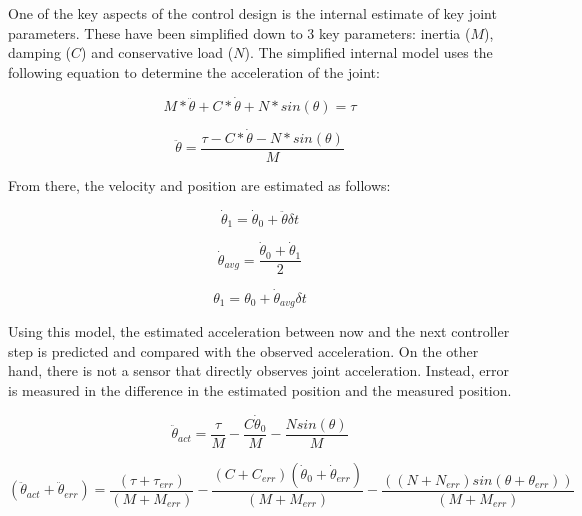 
One of the key aspects of the control design is the internal estimate of key 
joint parameters. These have been simplified down to 3 key parameters: inertia 
($M$), damping ($C$) and conservative load ($N$). The simplified internal 
model uses the following equation to determine the acceleration of the joint:

\begin{equation}
M * \ddot{\theta} + C * \dot{\theta} + N * sin(\theta) = \tau
\end{equation}

\begin{equation}
\ddot{\theta} = \dfrac{\tau - C * \dot{\theta} - N * sin(\theta)}{M}
\end{equation}

From there, the velocity and position are estimated as follows:

\begin{equation}
\dot{\theta}_{1} = \dot{\theta}_{0} + \ddot{\theta} \delta t
\end{equation}

\begin{equation}
\dot{\theta}_{avg} = \dfrac{\dot{\theta}_{0} + \dot{\theta}_{1}}{2}
\end{equation}

\begin{equation}
\theta_{1} = \theta_{0} + \dot{\theta}_{avg} \delta t
\end{equation}

Using this model, the estimated acceleration between now and the next controller 
step is predicted and compared with the observed acceleration. On the other hand,
there is not a sensor that directly observes joint acceleration. Instead, error
is measured in the difference in the estimated position and the measured 
position.


\begin{equation}
\ddot{\theta}_{act} = \dfrac{\tau}{M} - \dfrac{C \dot{\theta}_{0}}{M} - \dfrac{N sin(\theta)}{M}
\end{equation}

\begin{equation}
(\ddot{\theta}_{act} + \ddot{\theta}_{err}) = \dfrac{(\tau + \tau_{err})}{(M + M_{err})} - \dfrac{(C + C_{err}) (\dot{\theta}_{0} + \dot{\theta}_{err})}{(M + M_{err})} - \dfrac{((N + N_{err})sin(\theta + \theta_{err}))}{(M + M_{err})}
\end{equation}

